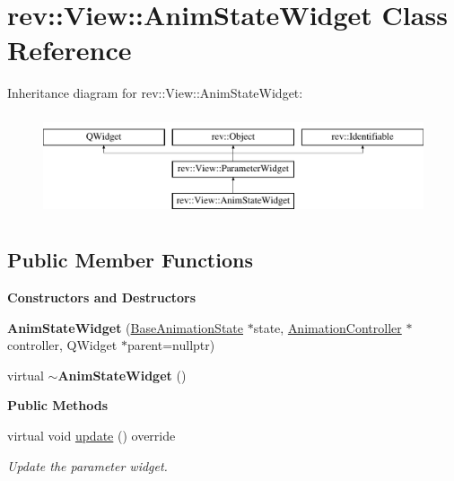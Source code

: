 \hypertarget{classrev_1_1_view_1_1_anim_state_widget}{}\section{rev\+::View\+::Anim\+State\+Widget Class Reference}
\label{classrev_1_1_view_1_1_anim_state_widget}
Inheritance diagram for rev\+::View\+::Anim\+State\+Widget\+:\begin{figure}[H]
\begin{center}
\leavevmode
\includegraphics[height=3.000000cm]{classrev_1_1_view_1_1_anim_state_widget}
\end{center}
\end{figure}
\subsection*{Public Member Functions}
\begin{Indent}\textbf{ Constructors and Destructors}\par
\begin{DoxyCompactItemize}
\item 
\mbox{\label{classrev_1_1_view_1_1_anim_state_widget_a6a939e906efc51419adad1b7ccfea022}} 
{\bfseries Anim\+State\+Widget} (\mbox{\hyperlink{classrev_1_1_base_animation_state}{Base\+Animation\+State}} $\ast$state, \mbox{\hyperlink{classrev_1_1_animation_controller}{Animation\+Controller}} $\ast$controller, Q\+Widget $\ast$parent=nullptr)
\item 
\mbox{\label{classrev_1_1_view_1_1_anim_state_widget_ad96a3be98e9749986058cac68d8e3bb3}} 
virtual {\bfseries $\sim$\+Anim\+State\+Widget} ()
\end{DoxyCompactItemize}
\end{Indent}
\begin{Indent}\textbf{ Public Methods}\par
\begin{DoxyCompactItemize}
\item 
\mbox{\label{classrev_1_1_view_1_1_anim_state_widget_a30632686d541c200d115bc079010106b}} 
virtual void \mbox{\hyperlink{classrev_1_1_view_1_1_anim_state_widget_a30632686d541c200d115bc079010106b}{update}} () override
\begin{DoxyCompactList}\small\item\em Update the parameter widget. \end{DoxyCompactList}\end{DoxyCompactItemize}
\end{Indent}
